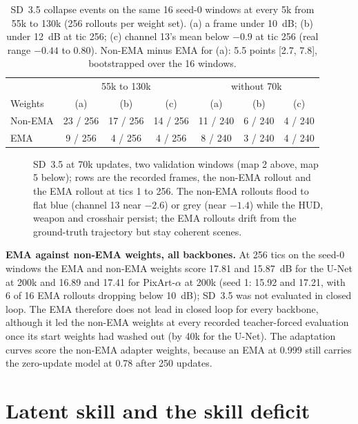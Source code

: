\begin{table}[ht]
\centering\footnotesize\setlength{\tabcolsep}{5pt}
\caption{SD~3.5 collapse events on the same 16 seed-0 windows at every 5k from 55k to 130k (256 rollouts per weight set). (a) a frame under 10~dB; (b) under 12~dB at tic 256; (c) channel 13's mean below $-0.9$ at tic 256 (real range $-0.44$ to $0.80$). Non-EMA minus EMA for (a): 5.5 points [2.7, 7.8], bootstrapped over the 16 windows.}
\label{tab:collapse}
\begin{tabular}{lcccccc}
\toprule
 & \multicolumn{3}{c}{55k to 130k} & \multicolumn{3}{c}{without 70k} \\
Weights & (a) & (b) & (c) & (a) & (b) & (c) \\
\midrule
Non-EMA & 23 / 256 & 17 / 256 & 14 / 256 & 11 / 240 & 6 / 240 & 4 / 240 \\
EMA & 9 / 256 & 4 / 256 & 4 / 256 & 8 / 240 & 3 / 240 & 4 / 240 \\
\bottomrule
\end{tabular}
\end{table}

\begin{figure}[ht]
\centering
{}
\caption{SD~3.5 at 70k updates, two validation windows (map 2 above, map 5 below); rows are the recorded frames, the non-EMA rollout and the EMA rollout at tics 1 to 256. The non-EMA rollouts flood to flat blue (channel 13 near $-2.6$) or grey (near $-1.4$) while the HUD, weapon and crosshair persist; the EMA rollouts drift from the ground-truth trajectory but stay coherent scenes.}
\label{fig:collapse}
\end{figure}

\textbf{EMA against non-EMA weights, all backbones.} At 256 tics on the seed-0 windows the EMA and non-EMA weights score 17.81 and 15.87~dB for the U-Net at 200k and 16.89 and 17.41 for PixArt-$\alpha$ at 200k (seed 1: 15.92 and 17.21, with 6 of 16 EMA rollouts dropping below 10~dB); SD~3.5 was not evaluated in closed loop. The EMA therefore does not lead in closed loop for every backbone, although it led the non-EMA weights at every recorded teacher-forced evaluation once its start weights had washed out (by 40k for the U-Net). The adaptation curves score the non-EMA adapter weights, because an EMA at 0.999 still carries the zero-update model at 0.78 after 250 updates.

\section{Latent skill and the skill deficit}
\label{app:skill}

